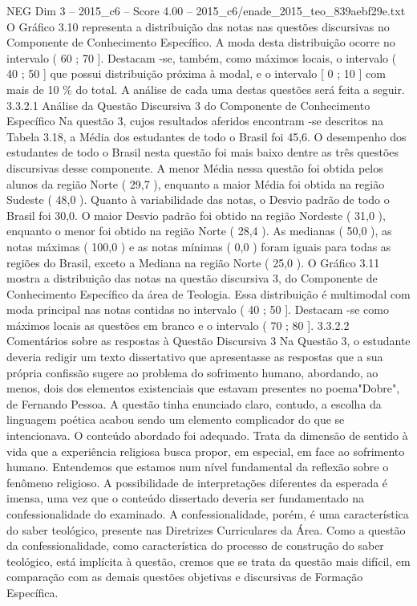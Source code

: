 \begin{textsample}{NEG Dim 3 – 2015\_c6 – Score 4.00 – 2015\_c6/enade\_2015\_teo\_839aebf29e.txt}
O Gráfico 3.10 representa a distribuição das notas nas questões discursivas no Componente de Conhecimento Específico.
A moda desta distribuição ocorre no intervalo ( 60 ; 70 ].
Destacam -se, também, como máximos locais, o intervalo ( 40 ; 50 ] que possui distribuição próxima à modal, e o intervalo [ 0 ; 10 ] com mais de 10 \% do total.
A análise de cada uma destas questões será feita a seguir. 3.3.2.1 Análise da Questão Discursiva 3 do Componente de Conhecimento Específico Na questão 3, cujos resultados aferidos encontram -se descritos na Tabela 3.18, a Média dos estudantes de todo o Brasil foi 45,6.
O desempenho dos estudantes de todo o Brasil nesta questão foi mais baixo dentre as três questões discursivas desse componente.
A menor Média nessa questão foi obtida pelos alunos da região Norte ( 29,7 ), enquanto a maior Média foi obtida na região Sudeste ( 48,0 ).
Quanto à variabilidade das notas, o Desvio padrão de todo o Brasil foi 30,0.
O maior Desvio padrão foi obtido na região Nordeste ( 31,0 ), enquanto o menor foi obtido na região Norte ( 28,4 ).
As medianas ( 50,0 ), as notas máximas ( 100,0 ) e as notas mínimas ( 0,0 ) foram iguais para todas as regiões do Brasil, exceto a Mediana na região Norte ( 25,0 ).
O Gráfico 3.11 mostra a distribuição das notas na questão discursiva 3, do Componente de Conhecimento Específico da área de Teologia.
Essa distribuição é multimodal com moda principal nas notas contidas no intervalo ( 40 ; 50 ].
Destacam -se como máximos locais as questões em branco e o intervalo ( 70 ; 80 ]. 3.3.2.2 Comentários sobre as respostas à Questão Discursiva 3 Na Questão 3, o estudante deveria redigir um texto dissertativo que apresentasse as respostas que a sua própria confissão sugere ao problema do sofrimento humano, abordando, ao menos, dois dos elementos existenciais que estavam presentes no poema"Dobre", de Fernando Pessoa.
A questão tinha enunciado claro, contudo, a escolha da linguagem poética acabou sendo um elemento complicador do que se intencionava.
O conteúdo abordado foi adequado.
Trata da dimensão de sentido à vida que a experiência religiosa busca propor, em especial, em face ao sofrimento humano.
Entendemos que estamos num nível fundamental da reflexão sobre o fenômeno religioso.
A possibilidade de interpretações diferentes da esperada é imensa, uma vez que o conteúdo dissertado deveria ser fundamentado na confessionalidade do examinado.
A confessionalidade, porém, é uma característica do saber teológico, presente nas Diretrizes Curriculares da Área.
Como a questão da confessionalidade, como característica do processo de construção do saber teológico, está implícita à questão, cremos que se trata da questão mais difícil, em comparação com as demais questões objetivas e discursivas de Formação Específica.

\end{textsample}
